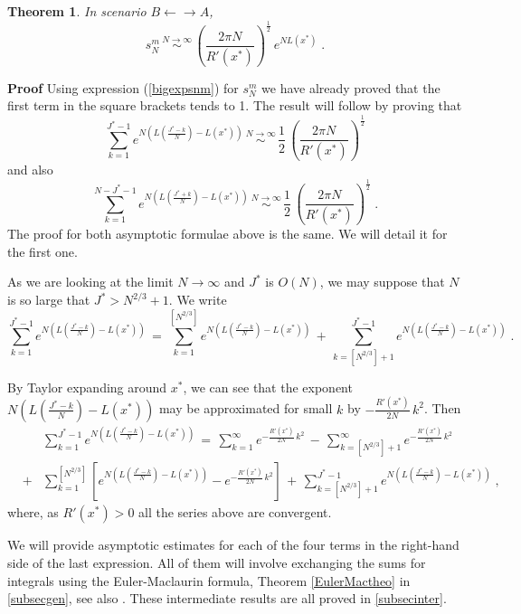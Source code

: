 \documentclass[12pt]{article}
\newtheorem{theorem}{Theorem}
\begin{document}
\begin{theorem}
	\label{theomainasymptotics}
	In scenario $B\leftarrow \rightarrow A$,
	\begin{equation}
	\label{asympformsnm}
	s_N^m \,\stackrel{N \rightarrow \infty}{\sim} \, \left(\frac{2\pi N}{R'(x^{\ast})}\right)^{\frac{1}{2}} \, e^{N L(x^{\ast})} \;.
	\end{equation}
\end{theorem}

\textbf{Proof}
Using expression (\ref{bigexpsnm}) for $s_N^m$ we have already proved that the first term in the square brackets tends to 1. The result will follow by proving that 
\[
\sum_{k=1}^{J^{\ast}-1} e^{N(L(\frac{J^{\ast}-k}{N})-L(x^{\ast}))}  \,\stackrel{N \rightarrow \infty}{\sim} \, \frac{1}{2} \, \left(\frac{2\pi N}{R'(x^{\ast})}\right)^{\frac{1}{2}}
\]
and also
\[
\sum_{k=1}^{N-J^{\ast}-1} e^{N(L(\frac{J^{\ast}+k}{N})-L(x^{\ast}))}  \,\stackrel{N \rightarrow \infty}{\sim} \, \frac{1}{2} \, \left(\frac{2\pi N}{R'(x^{\ast})}\right)^{\frac{1}{2}}\;.
\]
The proof for both asymptotic formulae above is the same. We will detail it for the first one. 

As we are looking at the limit $N \rightarrow \infty$ and $J^{\ast}$ is $O(N)$, we may suppose that $N$ is so large that $J^{\ast} > N^{2/3}+1$. We write
\[\sum_{k=1}^{J^{\ast}-1} e^{N(L(\frac{J^{\ast}-k}{N})-L(x^{\ast}))} \,=\, \sum_{k=1}^{[N^{2/3}]} e^{N(L(\frac{J^{\ast}-k}{N})-L(x^{\ast}))} \,+\, \sum_{k=[ N^{2/3}]+1}^{J^{\ast}-1} e^{N(L(\frac{J^{\ast}-k}{N})-L(x^{\ast}))}\;. \]

By Taylor expanding around $x^{\ast}$, we can see that the exponent $N(L(\frac{J^{\ast}-k}{N})-L(x^{\ast}))$ may be approximated for small $k$ by $-\frac{R'(x^{\ast})}{2N} \, k^2$. Then
\begin{eqnarray}
&&\sum_{k=1}^{J^{\ast}-1} e^{N(L(\frac{J^{\ast}-k}{N})-L(x^{\ast}))}\,=\, \sum_{k=1}^{\infty} e^{-\frac{R'(x^{\ast})}{2N} \, k^2} \,-\, \sum_{k=[ N^{2/3}]+1}^{\infty} e^{-\frac{R'(x^{\ast})}{2N} \, k^2}\nonumber\\
&+& \sum_{k=1}^{[ N^{2/3}]} \left[e^{N(L(\frac{J^{\ast}-k}{N})-L(x^{\ast}))}- e^{-\frac{R'(x^{\ast})}{2N} \, k^2}\right]\,+\,
\sum_{k=[ N^{2/3}]+1}^{J^{\ast}-1} e^{N(L(\frac{J^{\ast}-k}{N})-L(x^{\ast}))}\;, \nonumber
\end{eqnarray} 
where, as $R'(x^{\ast})>0$ all the series above are convergent.

We will provide asymptotic estimates for each of the four terms in the right-hand side of the last expression. All of them will involve exchanging the sums for integrals using the Euler-Maclaurin formula, Theorem \ref{EulerMactheo} in \ref{subsecgen}, see also \cite{apostol}. These intermediate results are all proved in \ref{subsecinter}.
\end{document}

